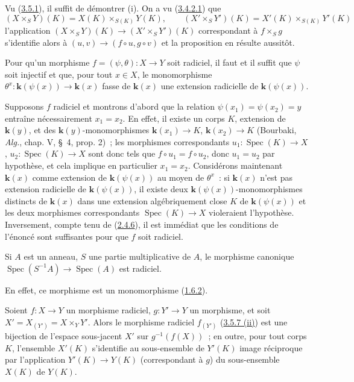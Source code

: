 Vu (\hyperref[I.3.5.1-fr]{3.5.1}), il suffit de démontrer (i). On a vu
(\hyperref[I.3.4.2.1-fr]{3.4.2.1}) que
\label{I.3.5.7.field-valued-product-fr}
\[
  (X\times_S Y)(K)=X(K)\times_{S(K)}Y(K),\qquad
  (X'\times_S Y')(K)=X'(K)\times_{S(K)}Y'(K)
\]
l'application $(X\times_S Y)(K)\to(X'\times_S Y')(K)$ correspondant à
$f\times_S g$ s'identifie alors à $(u,v)\to(f\circ u,g\circ v)$ et la
proposition en résulte aussitôt.

\begin{proposition}[3.5.8]
\label{I.3.5.8-fr}
Pour qu'un morphisme $f=(\psi,\theta):X\to Y$ soit radiciel, il faut et il
suffit que $\psi$ soit injectif et que, pour tout $x\in X$, le monomorphisme
$\theta^x:\boldsymbol{k}(\psi(x))\to\boldsymbol{k}(x)$ fasse de $\boldsymbol{k}(x)$ une extension radicielle de
$\boldsymbol{k}(\psi(x))$.
\end{proposition}

Supposons $f$ radiciel et montrons d'abord que la relation
$\psi(x_1)=\psi(x_2)=y$ entraîne nécessairement $x_1=x_2$. En effet, il
existe un corps $K$, extension de $\boldsymbol{k}(y)$, et des $\boldsymbol{k}(y)$-monomorphismes
$\boldsymbol{k}(x_1)\to K$, $\boldsymbol{k}(x_2)\to K$ (Bourbaki, \emph{Alg.}, chap. V, \S~4,
prop. 2)~; les morphismes correspondants
$u_1:\operatorname{Spec}(K)\to X$, $u_2:\operatorname{Spec}(K)\to X$ sont
donc tels que $f\circ u_1=f\circ u_2$, donc $u_1=u_2$ par hypothèse, et cela
implique en particulier $x_1=x_2$. Considérons maintenant $\boldsymbol{k}(x)$ comme
extension de $\boldsymbol{k}(\psi(x))$ au moyen de $\theta^x$~: si $\boldsymbol{k}(x)$ n'est pas
extension radicielle de $\boldsymbol{k}(\psi(x))$, il existe deux
$\boldsymbol{k}(\psi(x))$-monomorphismes distincts de $\boldsymbol{k}(x)$ dans une extension
algébriquement close $K$ de $\boldsymbol{k}(\psi(x))$ et les deux morphismes correspondants
$\operatorname{Spec}(K)\to X$ violeraient l'hypothèse. Inversement, compte
tenu de (\hyperref[I.2.4.6-fr]{2.4.6}), il est immédiat que les conditions de
l'énoncé sont suffisantes pour que $f$ soit radiciel.

\begin{corollary}[3.5.9]
\label{I.3.5.9-fr}
Si $A$ est un anneau, $S$ une partie multiplicative de $A$, le morphisme
canonique $\operatorname{Spec}(S^{-1}A)\to\operatorname{Spec}(A)$ est
radiciel.
\end{corollary}

En effet, ce morphisme est un monomorphisme
(\hyperref[I.1.6.2-fr]{1.6.2}).

\begin{corollary}[3.5.10]
\label{I.3.5.10-fr}
Soient $f:X\to Y$ un morphisme radiciel, $g:Y'\to Y$ un morphisme, et soit
$X'=X_{(Y')}=X\times_Y Y'$. Alors le morphisme radiciel $f_{(Y')}$
\textup{(\hyperref[I.3.5.7-fr]{3.5.7 (ii)})} est une bijection de l'espace sous-jacent
$X'$ sur $g^{-1}(f(X))$~; en outre, pour tout corps $K$, l'ensemble $X'(K)$
s'identifie au sous-ensemble de $Y'(K)$ image réciproque par l'application
$Y'(K)\to Y(K)$ (correspondant à $g$) du sous-ensemble $X(K)$ de $Y(K)$.
\end{corollary}

